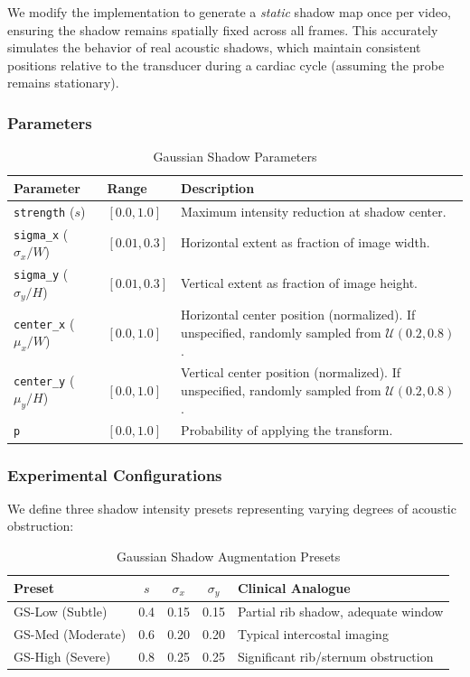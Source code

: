 \documentclass{article}
\theoremstyle{plain}
\theoremstyle{definition}
\theoremstyle{remark}
\begin{document}
We modify the implementation to generate a \textit{static} shadow map once per video, ensuring the shadow remains spatially fixed across all frames. This accurately simulates the behavior of real acoustic shadows, which maintain consistent positions relative to the transducer during a cardiac cycle (assuming the probe remains stationary).

\subsubsection{Parameters}

\begin{table}[h]
\centering
\caption{Gaussian Shadow Parameters}
\label{tab:gaussian_shadow_params}
\begin{tabular}{@{}llp{6.5cm}@{}}
\toprule
\textbf{Parameter} & \textbf{Range} & \textbf{Description} \\
\midrule
\texttt{strength} ($s$) & $[0.0, 1.0]$ & Maximum intensity reduction at shadow center. \\
\texttt{sigma\_x} ($\sigma_x/W$) & $[0.01, 0.3]$ & Horizontal extent as fraction of image width. \\
\texttt{sigma\_y} ($\sigma_y/H$) & $[0.01, 0.3]$ & Vertical extent as fraction of image height. \\
\texttt{center\_x} ($\mu_x/W$) & $[0.0, 1.0]$ & Horizontal center position (normalized). If unspecified, randomly sampled from $\mathcal{U}(0.2, 0.8)$. \\
\texttt{center\_y} ($\mu_y/H$) & $[0.0, 1.0]$ & Vertical center position (normalized). If unspecified, randomly sampled from $\mathcal{U}(0.2, 0.8)$. \\
\texttt{p} & $[0.0, 1.0]$ & Probability of applying the transform. \\
\bottomrule
\end{tabular}
\end{table}

\subsubsection{Experimental Configurations}

We define three shadow intensity presets representing varying degrees of acoustic obstruction:

\begin{table}[h]
\centering
\caption{Gaussian Shadow Augmentation Presets}
\label{tab:gaussian_shadow_presets}
\begin{tabular}{@{}lcccl@{}}
\toprule
\textbf{Preset} & \textbf{$s$} & \textbf{$\sigma_x$} & \textbf{$\sigma_y$} & \textbf{Clinical Analogue} \\
\midrule
GS-Low (Subtle) & 0.4 & 0.15 & 0.15 & Partial rib shadow, adequate window \\
GS-Med (Moderate) & 0.6 & 0.20 & 0.20 & Typical intercostal imaging \\
GS-High (Severe) & 0.8 & 0.25 & 0.25 & Significant rib/sternum obstruction \\
\bottomrule
\end{tabular}
\end{table}
\end{document}
